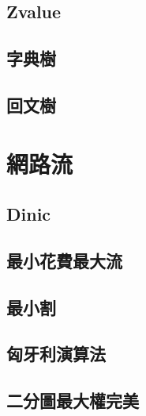 \documentclass[a4paper,10pt,twocolumn,oneside]{article}
\begin{document}
\subsection{Zvalue}

\subsection{字典樹}

\subsection{回文樹}



\section{網路流}
\subsection{Dinic}

\subsection{最小花費最大流}

\subsection{最小割}

\subsection{匈牙利演算法}

\subsection{二分圖最大權完美}



% 
% 
\end{document}
